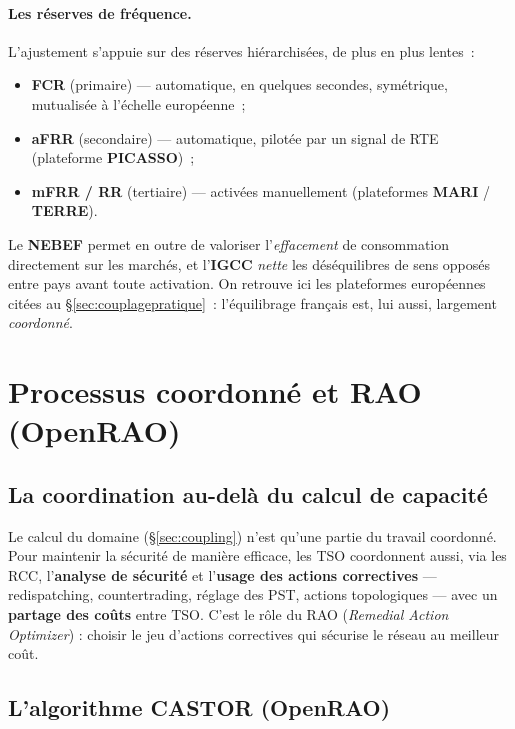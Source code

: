 \documentclass[11pt,a4paper]{article}
\begin{document}
\paragraph{Les réserves de fréquence.} L'ajustement s'appuie sur des
réserves hiérarchisées, de plus en plus lentes~:
\begin{itemize}[nosep,leftmargin=1.4em]
  \item \textbf{FCR} (primaire) — automatique, en quelques secondes,
        symétrique, mutualisée à l'échelle européenne~;
  \item \textbf{aFRR} (secondaire) — automatique, pilotée par un signal de
        RTE (plateforme \textbf{PICASSO})~;
  \item \textbf{mFRR / RR} (tertiaire) — activées manuellement (plateformes
        \textbf{MARI} / \textbf{TERRE}).
\end{itemize}
Le \textbf{NEBEF} permet en outre de valoriser l'\emph{effacement} de
consommation directement sur les marchés, et l'\textbf{IGCC} \emph{nette} les
déséquilibres de sens opposés entre pays avant toute activation. On retrouve
ici les plateformes européennes citées au \S\ref{sec:couplagepratique}~:
l'équilibrage français est, lui aussi, largement \emph{coordonné}.

\section{Processus coordonné et RAO (OpenRAO)}
\label{sec:rao}

\subsection{La coordination au-delà du calcul de capacité}

Le calcul du domaine (\S\ref{sec:coupling}) n'est qu'une partie du travail
coordonné. Pour maintenir la sécurité de manière efficace, les TSO
coordonnent aussi, via les RCC, l'\textbf{analyse de sécurité} et
l'\textbf{usage des actions correctives} — redispatching, countertrading,
réglage des PST, actions topologiques — avec un \textbf{partage des coûts}
entre TSO. C'est le rôle du RAO (\emph{Remedial Action Optimizer}) : choisir
le jeu d'actions correctives qui sécurise le réseau au meilleur coût.

\subsection{L'algorithme CASTOR (OpenRAO)}
\end{document}
